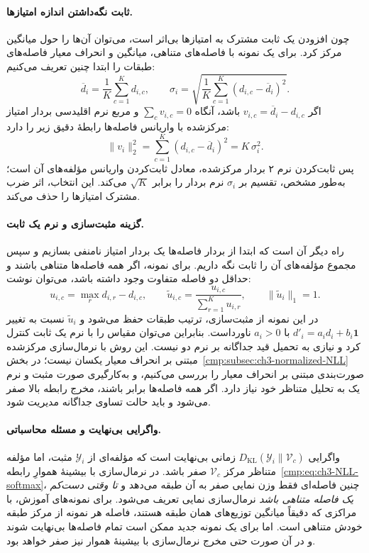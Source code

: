 \paragraph{ثابت نگه‌داشتن اندازه امتیازها.}
چون افزودن یک ثابت مشترک به امتیازها بی‌اثر است،
می‌توان آن‌ها را حول میانگین مرکز کرد. برای یک نمونه
با فاصله‌های متناهی، میانگین و انحراف معیار فاصله‌های
طبقات را ابتدا چنین تعریف می‌کنیم:
\begin{equation}\label{cmp:eq:ch3-distance-statistics}
\overline d_i=\frac1K\sum_{c=1}^{K}d_{i,c},
\qquad
\sigma_i=\sqrt{\frac1K\sum_{c=1}^{K}
(d_{i,c}-\overline d_i)^2}.
\end{equation}
اگر $v_{i,c}=\overline d_i-d_{i,c}$ باشد،
آنگاه $\sum_cv_{i,c}=0$ و مربع نرم اقلیدسی
بردار امتیاز مرکز‌شده با واریانس فاصله‌ها رابطهٔ دقیق زیر را دارد:
\begin{equation}\label{cmp:eq:ch3-NLL-centered-L2}
\|v_i\|_2^2=\sum_{c=1}^{K}(d_{i,c}-\overline d_i)^2
=K\,\sigma_i^2.
\end{equation}
پس ثابت‌کردن نرم ۲ بردار مرکز‌شده، معادل ثابت‌کردن واریانس مؤلفه‌های آن است؛ به‌طور مشخص، تقسیم بر $\sigma_i$ نرم بردار را برابر $\sqrt K$ می‌کند. این انتخاب، اثر ضرب مشترک امتیازها را حذف می‌کند.

\paragraph{گزینه مثبت‌سازی و نرم یک ثابت.}
راه دیگر آن است که ابتدا از بردار فاصله‌ها یک بردار امتیاز نامنفی بسازیم و سپس مجموع مؤلفه‌های آن را ثابت نگه داریم. برای نمونه، اگر همه فاصله‌ها متناهی باشند و حداقل دو فاصله متفاوت وجود داشته باشد، می‌توان نوشت:
\begin{equation}\label{cmp:eq:ch3-NLL-positive-L1-example}
u_{i,c}=\max_{r}d_{i,r}-d_{i,c},
\qquad
\widetilde u_{i,c}=\frac{u_{i,c}}{\sum_{r=1}^{K}u_{i,r}},
\qquad \|\widetilde u_i\|_1=1.
\end{equation}
در این نمونه از مثبت‌سازی، ترتیب طبقات حفظ می‌شود و $\widetilde u_i$ نسبت به تغییر $d'_i=a_i d_i+b_i\mathbf1$ با $a_i>0$ ناورداست. بنابراین می‌توان مقیاس را با نرم یک ثابت کنترل کرد و نیازی به تحمیل قید جداگانه بر نرم دو نیست. این روش با نرمال‌سازی مرکز‌شده مبتنی بر انحراف معیار یکسان نیست؛ در بخش~\ref{cmp:subsec:ch3-normalized-NLL} صورت‌بندی مبتنی بر انحراف معیار را بررسی می‌کنیم، و به‌کارگیری صورت مثبت و نرم یک به تحلیل متناظر خود نیاز دارد. اگر همه فاصله‌ها برابر باشند، مخرج رابطه بالا صفر می‌شود و باید حالت تساوی جداگانه مدیریت شود.

\paragraph{واگرایی بی‌نهایت و مسئله محاسباتی.}
واگرایی $D_{\mathrm{KL}}(\mathscr Y_i\|\mathcal V_c)$ زمانی بی‌نهایت است که مؤلفه‌ای از $\mathscr Y_i$ مثبت، اما مؤلفه متناظر مرکز $\mathcal V_c$ صفر باشد. در نرمال‌سازی با بیشینهٔ هموارِ رابطه~\eqref{cmp:eq:ch3-NLL-softmax}، چنین فاصله‌ای فقط وزن نمایی صفر به آن طبقه می‌دهد و \emph{تا وقتی دست‌کم یک فاصله متناهی باشد} نرمال‌سازی نمایی تعریف می‌شود. برای نمونه‌های آموزش، با مراکزی که دقیقاً میانگین توزیع‌های همان طبقه هستند، فاصله هر نمونه از مرکز طبقه خودش متناهی است. اما برای یک نمونه جدید ممکن است تمام فاصله‌ها بی‌نهایت شوند و در آن صورت حتی مخرج نرمال‌سازی با بیشینهٔ هموار نیز صفر خواهد بود.

